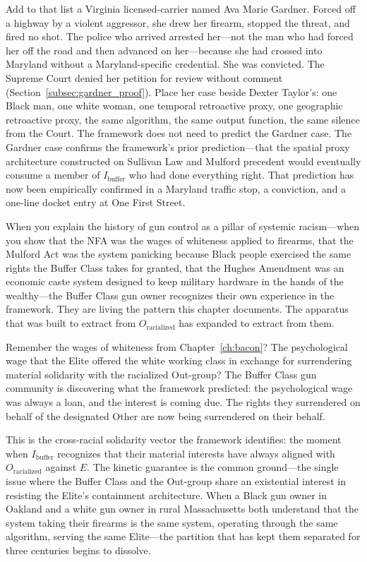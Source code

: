 Add to that list a Virginia licensed-carrier named Ava Marie Gardner. Forced off a highway by a violent aggressor, she drew her firearm, stopped the threat, and fired no shot. The police who arrived arrested her---not the man who had forced her off the road and then advanced on her---because she had crossed into Maryland without a Maryland-specific credential. She was convicted. The Supreme Court denied her petition for review without comment (Section~\ref{subsec:gardner_proof}). Place her case beside Dexter Taylor's: one Black man, one white woman, one temporal retroactive proxy, one geographic retroactive proxy, the same algorithm, the same output function, the same silence from the Court. The framework does not need to predict the Gardner case. The Gardner case confirms the framework's prior prediction---that the spatial proxy architecture constructed on Sullivan Law and Mulford precedent would eventually consume a member of $I_{\text{buffer}}$ who had done everything right. That prediction has now been empirically confirmed in a Maryland traffic stop, a conviction, and a one-line docket entry at One First Street.

When you explain the history of gun control as a pillar of systemic racism---when you show that the NFA was the wages of whiteness applied to firearms, that the Mulford Act was the system panicking because Black people exercised the same rights the Buffer Class takes for granted, that the Hughes Amendment was an economic caste system designed to keep military hardware in the hands of the wealthy---the Buffer Class gun owner recognizes their own experience in the framework. They are living the pattern this chapter documents. The apparatus that was built to extract from $O_{\text{racialized}}$ has expanded to extract from them.

Remember the wages of whiteness from Chapter~\ref{ch:bacon}? The psychological wage that the Elite offered the white working class in exchange for surrendering material solidarity with the racialized Out-group? The Buffer Class gun community is discovering what the framework predicted: the psychological wage was always a loan, and the interest is coming due. The rights they surrendered on behalf of the designated Other are now being surrendered on their behalf.

This is the cross-racial solidarity vector the framework identifies: the moment when $I_{\text{buffer}}$ recognizes that their material interests have always aligned with $O_{\text{racialized}}$ against $E$. The kinetic guarantee is the common ground---the single issue where the Buffer Class and the Out-group share an existential interest in resisting the Elite's containment architecture. When a Black gun owner in Oakland and a white gun owner in rural Massachusetts both understand that the system taking their firearms is the same system, operating through the same algorithm, serving the same Elite---the partition that has kept them separated for three centuries begins to dissolve.

